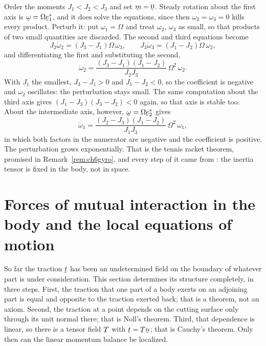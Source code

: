 Order the moments $J_{1}<J_{2}<J_{3}$ and set $\bm=\bze$. Steady
rotation about the first axis is $\bom=\Omega\be^{*}_{1}$, and it does
solve the equations, since then $\omega_{2}=\omega_{3}=0$ kills every
product. Perturb it: put $\omega_{1}=\Omega$ and treat $\omega_{2}$,
$\omega_{3}$ as small, so that products of two small quantities are
discarded. The second and third equations become
\[
   J_{2}\dot\omega_{2}=(J_{3}-J_{1})\Omega\,\omega_{3} ,
   \qquad
   J_{3}\dot\omega_{3}=(J_{1}-J_{2})\Omega\,\omega_{2} ,
\]
and differentiating the first and substituting the second,
\[
   \ddot\omega_{2}
   =\frac{(J_{3}-J_{1})(J_{1}-J_{2})}{J_{2}J_{3}}\,\Omega^{2}\,
    \omega_{2} .
\]
With $J_{1}$ the smallest, $J_{3}-J_{1}>0$ and $J_{1}-J_{2}<0$, so the
coefficient is negative and $\omega_{2}$ oscillates: the perturbation
stays small. The same computation about the third axis gives
$(J_{1}-J_{3})(J_{3}-J_{2})<0$ again, so that axis is stable too. About
the intermediate axis, however, $\bom=\Omega\be^{*}_{2}$ gives
\[
   \ddot\omega_{1}
   =\frac{(J_{2}-J_{3})(J_{1}-J_{2})}{J_{1}J_{3}}\,\Omega^{2}\,
    \omega_{1} ,
\]
in which both factors in the numerator are negative and the coefficient
is positive. The perturbation grows exponentially. That is the tennis
racket theorem, promised in Remark~\ref{rem:ch6gyro}, and every step of
it came from : the inertia tensor is fixed in the body, not in
space.

\section{Forces of mutual interaction in the body and the local
equations of motion}\label{sec:ch6local}

So far the traction $\bt$ has been an undetermined field on the
boundary of whatever part is under consideration. This section
determines its structure completely, in three steps. First, the
traction that one part of a body exerts on an adjoining part is equal
and opposite to the traction exerted back; that is a theorem, not an
axiom. Second, the traction at a point depends on the cutting surface
only through its unit normal there; that is Noll's theorem. Third, that
dependence is linear, so there is a tensor field $\bT$ with
$\bt=\bT\bn$; that is Cauchy's theorem. Only then can the linear
momentum balance be localized.

